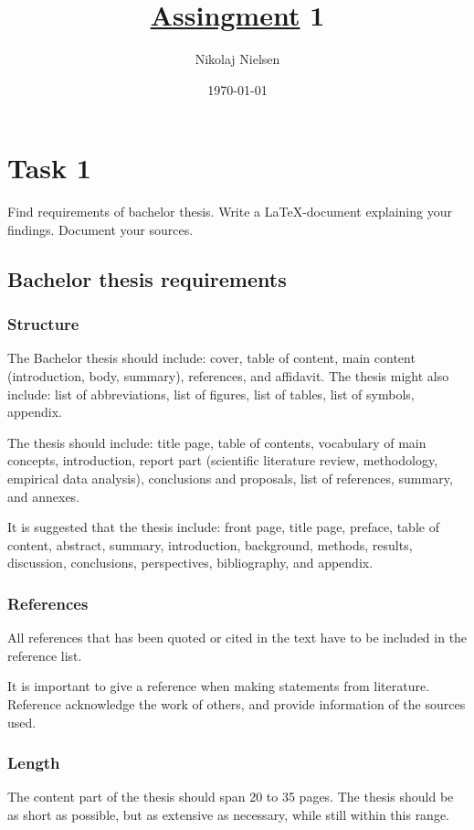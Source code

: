 \documentclass[a4paper]{article}
\title{\href{https://datsoftlyngby.github.io/soft2020fall/resources/8af56d7d-assignment-01.pdf}{Assingment} 1}
\author{Nikolaj Nielsen}
\date{\today}
\begin{document}
\maketitle
\tableofcontents

\section{Task 1}
Find requirements of bachelor thesis. Write a \LaTeX -document explaining your
findings. Document your sources.

\subsection{Bachelor thesis requirements}

\subsubsection{Structure}
The Bachelor thesis should include: cover, table of content, main content (introduction, body, summary), references, and affidavit. The thesis might also include: list of abbreviations, list of figures, list of tables, list of symbols, appendix.\cite{unimannheim2014guidelines}

\noindent The thesis should include: title page, table of contents, vocabulary of main concepts, introduction, report part (scientific literature review, methodology, empirical data analysis), conclusions and proposals, list of references, summary, and annexes.\cite{mru2018requirements}

\noindent It is suggested that the thesis include: front page, title page, preface, table of content, abstract, summary, introduction, background, methods, results, discussion, conclusions, perspectives, bibliography, and appendix.\cite{au2020guidelines}

\subsubsection{References}
All references that has been quoted or cited in the text have to be included in the reference list.\cite{unimannheim2014guidelines}

\noindent It is important to give a reference when making statements from literature. Reference acknowledge the work of others, and provide information of the sources used.\cite{au2020guidelines}

\subsubsection{Length}
The content part of the thesis should span 20 to 35 pages. The thesis should be as short as possible, but as extensive as necessary, while still within this range.\cite{unimannheim2014guidelines}
\end{document}
